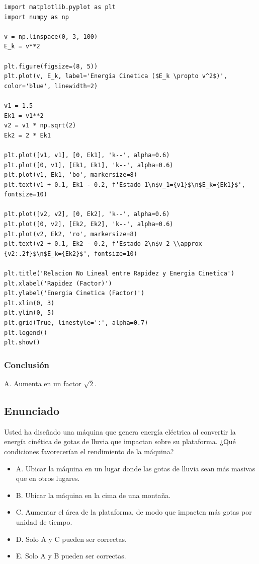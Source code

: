\documentclass[12pt, a4paper]{article}
\begin{document}
\begin{lstlisting}
import matplotlib.pyplot as plt
import numpy as np

v = np.linspace(0, 3, 100)
E_k = v**2

plt.figure(figsize=(8, 5))
plt.plot(v, E_k, label='Energia Cinetica ($E_k \propto v^2$)', color='blue', linewidth=2)

v1 = 1.5
Ek1 = v1**2
v2 = v1 * np.sqrt(2)
Ek2 = 2 * Ek1

plt.plot([v1, v1], [0, Ek1], 'k--', alpha=0.6)
plt.plot([0, v1], [Ek1, Ek1], 'k--', alpha=0.6)
plt.plot(v1, Ek1, 'bo', markersize=8)
plt.text(v1 + 0.1, Ek1 - 0.2, f'Estado 1\n$v_1={v1}$\n$E_k={Ek1}$', fontsize=10)

plt.plot([v2, v2], [0, Ek2], 'k--', alpha=0.6)
plt.plot([0, v2], [Ek2, Ek2], 'k--', alpha=0.6)
plt.plot(v2, Ek2, 'ro', markersize=8)
plt.text(v2 + 0.1, Ek2 - 0.2, f'Estado 2\n$v_2 \\approx {v2:.2f}$\n$E_k={Ek2}$', fontsize=10)

plt.title('Relacion No Lineal entre Rapidez y Energia Cinetica')
plt.xlabel('Rapidez (Factor)')
plt.ylabel('Energia Cinetica (Factor)')
plt.xlim(0, 3)
plt.ylim(0, 5)
plt.grid(True, linestyle=':', alpha=0.7)
plt.legend()
plt.show()
\end{lstlisting}

\subsubsection*{Conclusión}

A. Aumenta en un factor $\sqrt{2}$.

\newpage

\subsection*{Enunciado}

Usted ha diseñado una máquina que genera energía eléctrica al convertir la energía cinética de gotas de lluvia que impactan sobre su plataforma. ¿Qué condiciones favorecerían el rendimiento de la máquina?

\begin{itemize}
    \item A. Ubicar la máquina en un lugar donde las gotas de lluvia sean más masivas que en otros lugares.
    \item B. Ubicar la máquina en la cima de una montaña.
    \item C. Aumentar el área de la plataforma, de modo que impacten más gotas por unidad de tiempo.
    \item D. Solo A y C pueden ser correctas.
    \item E. Solo A y B pueden ser correctas.
\end{itemize}
\end{document}
